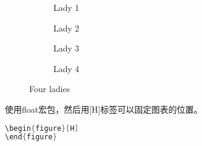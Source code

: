 \documentclass[a4paper,12pt]{article}
\begin{document}
\begin{figure}[H]
	\begin{subfigure}[b]{.5\linewidth}
	\centering
	\fontsize{150}{60}\selectfont\Ladiesroom
	\caption{Lady 1}\label{fig:21a}
	\end{subfigure} %
	\begin{subfigure}[b]{.5\linewidth}
	\centering
	\fontsize{150}{60}\selectfont\Ladiesroom
	\caption{Lady 2}\label{fig:2b}
	\end{subfigure}
	
	\begin{subfigure}[b]{.5\linewidth}
	\centering
	\fontsize{150}{60}\selectfont\Ladiesroom
	\caption{Lady 3}\label{fig:2c}
	\end{subfigure} %
	\begin{subfigure}[b]{.5\linewidth}
	\centering
	\fontsize{150}{60}\selectfont\Ladiesroom
	\caption{Lady 4}\label{fig:2d}
	\end{subfigure}
\caption{Four ladies}\label{fig:2}
\end{figure}

使用float宏包，然后用[H]标签可以固定图表的位置。

\begin{lstlisting}[language=c++]
\begin{figure}[H]
\end{figure}
\end{lstlisting}
\end{document}
